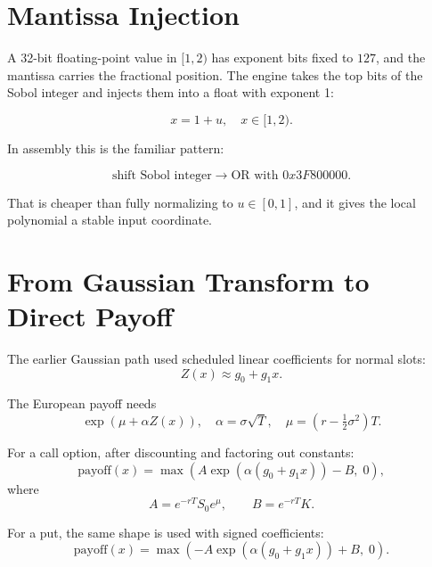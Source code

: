 \documentclass[11pt,a4paper]{article}
\begin{document}
\section{Mantissa Injection}

A 32-bit floating-point value in \([1,2)\) has exponent bits fixed to
\(127\), and the mantissa carries the fractional position. The engine takes the
top bits of the Sobol integer and injects them into a float with exponent 1:

\[
  x = 1 + u,\quad x\in[1,2).
\]

In assembly this is the familiar pattern:

\[
  \text{shift Sobol integer} \rightarrow
  \text{OR with }0x3F800000.
\]

That is cheaper than fully normalizing to \(u\in[0,1]\), and it gives the local
polynomial a stable input coordinate.

\begin{center}
\end{center}

\section{From Gaussian Transform to Direct Payoff}

The earlier Gaussian path used scheduled linear coefficients for normal slots:
\[
  Z(x) \approx g_0 + g_1x.
\]

The European payoff needs
\[
  \exp(\mu + \alpha Z(x)),\quad
  \alpha = \sigma\sqrt{T},\quad
  \mu=(r-\tfrac12\sigma^2)T.
\]

For a call option, after discounting and factoring out constants:
\[
  \text{payoff}(x) =
  \max\left(A\exp(\alpha(g_0+g_1x)) - B,\;0\right),
\]
where
\[
  A=e^{-rT}S_0e^{\mu},\qquad B=e^{-rT}K.
\]

For a put, the same shape is used with signed coefficients:
\[
  \text{payoff}(x) =
  \max\left(-A\exp(\alpha(g_0+g_1x)) + B,\;0\right).
\]
\end{document}
